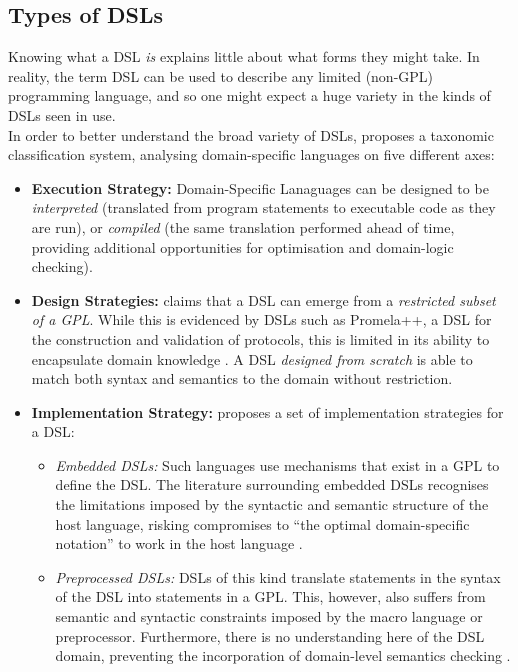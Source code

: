 \subsection{Types of DSLs} %
\label{sub:types_of_dsls}
Knowing what a DSL \textit{is} explains little about what forms they might take. 
In reality, the term DSL can be used to describe any limited (non-GPL) programming language, and so one might expect a huge variety in the kinds of DSLs seen in use. \\

In order to better understand the broad variety of DSLs, \citet{van2000domain} proposes a taxonomic classification system, analysing domain-specific languages on five different axes:
\begin{itemize}
    \item \textbf{Execution Strategy:} Domain-Specific Lanaguages can be designed to be \textit{interpreted} (translated from program statements to executable code as they are run), or \textit{compiled} (the same translation performed ahead of time, providing additional opportunities for optimisation and domain-logic checking).
    \item \textbf{Design Strategies:} \citet{van2000domain} claims that a DSL can emerge from a \textit{restricted subset of a GPL}. 
    While this is evidenced by DSLs such as Promela++, a DSL for the construction and validation of protocols, this is limited in its ability to encapsulate domain knowledge \citep{basu1997language}.
    A DSL \textit{designed from scratch} is able to match both syntax and semantics to the domain without restriction. 
    \item \textbf{Implementation Strategy:} \citet{van2000domain} proposes a set of implementation strategies for a DSL:
    \begin{itemize}
        \item \textit{Embedded DSLs:} Such languages use mechanisms that exist in a GPL to define the DSL. 
        The literature surrounding embedded DSLs recognises the limitations imposed by the syntactic and semantic structure of the host language, risking compromises to ``the optimal domain-specific notation'' to work in the host language \citep[pg. 3]{van2000domain}.
        \item \textit{Preprocessed DSLs:} DSLs of this kind translate statements in the syntax of the DSL into statements in a GPL. 
        This, however, also suffers from semantic and syntactic constraints imposed by the macro language or preprocessor. 
        Furthermore, there is no understanding here of the DSL domain, preventing the incorporation of domain-level semantics checking \citep{van2000domain}.

\end{itemize}
\end{itemize}
